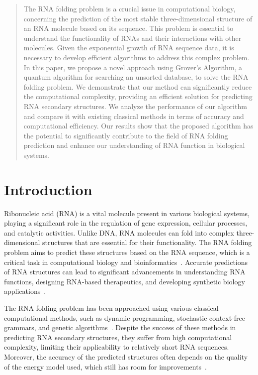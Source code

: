 \begin{abstract}
The RNA folding problem is a crucial issue in computational biology, concerning the prediction of the most stable three-dimensional structure of an RNA molecule based on its sequence. This problem is essential to understand the functionality of RNAs and their interactions with other molecules. Given the exponential growth of RNA sequence data, it is necessary to develop efficient algorithms to address this complex problem. In this paper, we propose a novel approach using Grover's Algorithm, a quantum algorithm for searching an unsorted database, to solve the RNA folding problem. We demonstrate that our method can significantly reduce the computational complexity, providing an efficient solution for predicting RNA secondary structures. We analyze the performance of our algorithm and compare it with existing classical methods in terms of accuracy and computational efficiency. Our results show that the proposed algorithm has the potential to significantly contribute to the field of RNA folding prediction and enhance our understanding of RNA function in biological systems.
\end{abstract}

\section{Introduction}

Ribonucleic acid (RNA) is a vital molecule present in various biological systems, playing a significant role in the regulation of gene expression, cellular processes, and catalytic activities. Unlike DNA, RNA molecules can fold into complex three-dimensional structures that are essential for their functionality. The RNA folding problem aims to predict these structures based on the RNA sequence, which is a critical task in computational biology and bioinformatics~\cite{tinoco1999rna}. Accurate predictions of RNA structures can lead to significant advancements in understanding RNA functions, designing RNA-based therapeutics, and developing synthetic biology applications~\cite{das2007rna}.

The RNA folding problem has been approached using various classical computational methods, such as dynamic programming, stochastic context-free grammars, and genetic algorithms~\cite{hofacker1994fast, knudsen1999rna, andronescu2004rna}. Despite the success of these methods in predicting RNA secondary structures, they suffer from high computational complexity, limiting their applicability to relatively short RNA sequences. Moreover, the accuracy of the predicted structures often depends on the quality of the energy model used, which still has room for improvements~\cite{zuker2000rna, mathews2004incorporating}.

